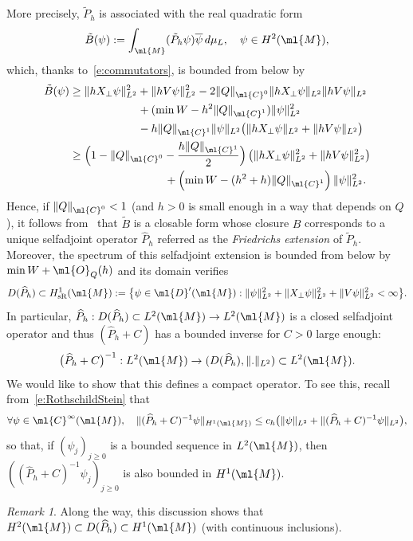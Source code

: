 \documentclass[JEP,XML,SOM,Unicode, NoEqCountersInSection,published]{cedram}
\theoremstyle{plain}
\theoremstyle{definition}
\theoremstyle{remark}
\newtheorem{rema}[theo]{Remark}
\begin{document}
More precisely, $\tilde{P}_{h}$ is associated with the real quadratic form
\[
\tilde{B}(\psi):=\int_{\ml{M}}(\tilde{P}_h\psi)\overline{\psi} \, d\mu_L,\quad \psi\in H^2(\ml{M}),
\]
which, thanks to~\eqref{e:commutators}, is bounded from below by
\begin{align*}\tilde{B}(\psi) & \geq\|hX_\perp\psi\|^2_{L^2} +\|hV\psi\|^2_{L^2}-2\|Q\|_{\ml{C}^0}\|hX_\perp\psi\|_{L^2}\|hV\psi\|_{L^2} \\
& \hspace*{2.15cm} +(\min W-h^2\|Q\|_{\ml{C}^1})\|\psi\|^2_{L^2}\\
& \hspace*{2.15cm} -h\|Q\|_{\ml{C}^1}\|\psi\|_{L^2}\big(\|hX_\perp\psi\|_{L^2}+\|hV\psi\|_{L^2}\big)\\
& \geq \Bigl(1-\|Q\|_{\ml{C}^0}-\frac{h\|Q\|_{\ml{C}^1}}{2}\Bigr) \left(\|hX_\perp\psi\|^2_{L^2}+\|hV\psi\|^2_{L^2}\right)\\
& \hspace*{3cm} +\left(\min W-(h^2+h)\|Q\|_{\ml{C}^1}\right)\|\psi\|^2_{L^2}.
\end{align*}
Hence, if $\|Q\|_{\ml{C}^0}<1$ (and $h>0$ is small enough in a way that depends on $Q$), it follows from~\cite[Th.\,X.23]{ReedSimon75} that $\tilde{B}$ is a closable form whose closure $B$ corresponds to a unique selfadjoint operator $\widehat{P}_h$ referred as the \emph{Friedrichs extension} of $\tilde{P}_h$. Moreover, the spectrum of this selfadjoint extension is bounded from below by $\min W+\ml{O}_Q(h)$ and its domain verifies
\[
D(\widehat{P}_h)\subset H^1_{\text{sR}}(\ml{M}):=\bigl\{\psi\in\ml{D}'(\ml{M}): \|\psi\|_{L^2}^2+\|X_\perp\psi\|_{L^2}^2+\|V\psi\|^2_{L^2}<\infty\bigr\}.
\]
In particular, $\widehat{P}_h:D(\widehat{P}_h)\subset L^2(\ml{M})\to L^2(\ml{M})$ is a closed selfadjoint operator and thus $(\widehat{P}_h+C)$ has a bounded inverse for $C>0$ large enough:
\[
\big(\widehat{P}_h+C\big)^{-1}:L^2(\ml{M})\to (D(\widehat{P}_h),\|.\|_{L^2})\subset L^2(\ml{M}).
\]
We would like to show that this defines a compact operator. To see this, recall from~\eqref{e:RothschildStein} that
\[
\forall\psi\in\ml{C}^{\infty}(\ml{M}),\quad \|(\widehat{P}_h+C)^{-1}\psi\|_{H^1(\ml{M})}\leq c_h\big(\|\psi\|_{L^2}+\|(\widehat{P}_h+C)^{-1}\psi\|_{L^2}\big),
\]
so that, if $(\psi_j)_{j\geq 0}$ is a bounded sequence in $L^2(\ml{M})$, then $((\widehat{P}_h+C)^{-1}\psi_j)_{j\geq 0}$ is also bounded in $H^1(\ml{M})$.
\begin{rema}\label{r:domain} Along the way, this discussion shows that $H^2(\ml{M})\subset D(\widehat{P}_h)\subset H^1(\ml{M})$ (with continuous inclusions).
\end{rema}
\end{document}
